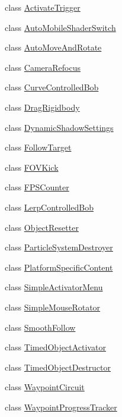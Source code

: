 \begin{DoxyCompactItemize}
\item 
class \hyperlink{class_unity_standard_assets_1_1_utility_1_1_activate_trigger}{Activate\+Trigger}
\item 
class \hyperlink{class_unity_standard_assets_1_1_utility_1_1_auto_mobile_shader_switch}{Auto\+Mobile\+Shader\+Switch}
\item 
class \hyperlink{class_unity_standard_assets_1_1_utility_1_1_auto_move_and_rotate}{Auto\+Move\+And\+Rotate}
\item 
class \hyperlink{class_unity_standard_assets_1_1_utility_1_1_camera_refocus}{Camera\+Refocus}
\item 
class \hyperlink{class_unity_standard_assets_1_1_utility_1_1_curve_controlled_bob}{Curve\+Controlled\+Bob}
\item 
class \hyperlink{class_unity_standard_assets_1_1_utility_1_1_drag_rigidbody}{Drag\+Rigidbody}
\item 
class \hyperlink{class_unity_standard_assets_1_1_utility_1_1_dynamic_shadow_settings}{Dynamic\+Shadow\+Settings}
\item 
class \hyperlink{class_unity_standard_assets_1_1_utility_1_1_follow_target}{Follow\+Target}
\item 
class \hyperlink{class_unity_standard_assets_1_1_utility_1_1_f_o_v_kick}{F\+O\+V\+Kick}
\item 
class \hyperlink{class_unity_standard_assets_1_1_utility_1_1_f_p_s_counter}{F\+P\+S\+Counter}
\item 
class \hyperlink{class_unity_standard_assets_1_1_utility_1_1_lerp_controlled_bob}{Lerp\+Controlled\+Bob}
\item 
class \hyperlink{class_unity_standard_assets_1_1_utility_1_1_object_resetter}{Object\+Resetter}
\item 
class \hyperlink{class_unity_standard_assets_1_1_utility_1_1_particle_system_destroyer}{Particle\+System\+Destroyer}
\item 
class \hyperlink{class_unity_standard_assets_1_1_utility_1_1_platform_specific_content}{Platform\+Specific\+Content}
\item 
class \hyperlink{class_unity_standard_assets_1_1_utility_1_1_simple_activator_menu}{Simple\+Activator\+Menu}
\item 
class \hyperlink{class_unity_standard_assets_1_1_utility_1_1_simple_mouse_rotator}{Simple\+Mouse\+Rotator}
\item 
class \hyperlink{class_unity_standard_assets_1_1_utility_1_1_smooth_follow}{Smooth\+Follow}
\item 
class \hyperlink{class_unity_standard_assets_1_1_utility_1_1_timed_object_activator}{Timed\+Object\+Activator}
\item 
class \hyperlink{class_unity_standard_assets_1_1_utility_1_1_timed_object_destructor}{Timed\+Object\+Destructor}
\item 
class \hyperlink{class_unity_standard_assets_1_1_utility_1_1_waypoint_circuit}{Waypoint\+Circuit}
\item 
class \hyperlink{class_unity_standard_assets_1_1_utility_1_1_waypoint_progress_tracker}{Waypoint\+Progress\+Tracker}
\end{DoxyCompactItemize}
